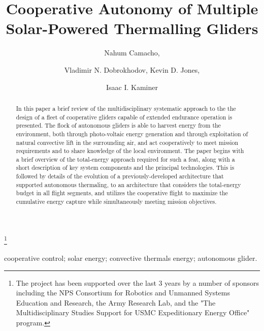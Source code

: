 \documentclass{ifacconf}
\begin{document}
\begin{frontmatter}

\title{Cooperative Autonomy of Multiple Solar-Powered Thermalling Gliders }

\thanks[footnoteinfo]{The project has been supported over the last 3 years by a number of sponsors including the NPS Consortium for Robotics and Unmanned Systems Education and Research, the Army Research Lab, and the "The Multidisciplinary Studies Support for USMC Expeditionary Energy Office" program.}

\author[First]{Nahum Camacho,}
\author[Second]{Vladimir N. Dobrokhodov, Kevin D. Jones,}
\author[Third]{Isaac I. Kaminer}

\address[First]{Graduate student at the Department  of Mechanical and Aerospace Engineering, Naval Postgraduate School, Monterey, CA 93943 USA (e-mail: ncamacho@nps.edu)}
\address[Second]{Research Associate Professors at the Department  of Mechanical and Aerospace Engineering, Naval Postgraduate School, Monterey, CA 93943 USA (e-mail: {vndobrok, kdjones}@nps.edu)}
\address[Third]{Professor at the Department  of Mechanical and Aerospace Engineering, Naval Postgraduate School, Monterey, CA 93943 USA (e-mail: kaminer@nps.edu)}


\begin{keyword}                           %
cooperative control; solar energy; convective thermals energy; autonomous glider.
\end{keyword}                             %


\begin{abstract}                          %
In this paper a brief review of the multidisciplinary systematic approach to the the design of a fleet of cooperative gliders capable of extended endurance operation is presented. The flock of autonomous gliders is able to harvest energy from the environment, both through photo-voltaic energy generation and through exploitation of natural convective lift in the surrounding air, and act cooperatively to meet mission requirements and to share knowledge of the local environment. The paper begins with a brief overview of the total-energy approach required for such a feat, along with a short description of key system components and the principal technologies. This is followed by details of the evolution of a previously-developed architecture that supported autonomous thermaling, to an architecture that considers the total-energy budget in all flight segments, and utilizes the cooperative flight to maximize the cumulative energy capture while simultaneously meeting mission objectives.
\end{abstract}

\end{frontmatter}
\end{document}
